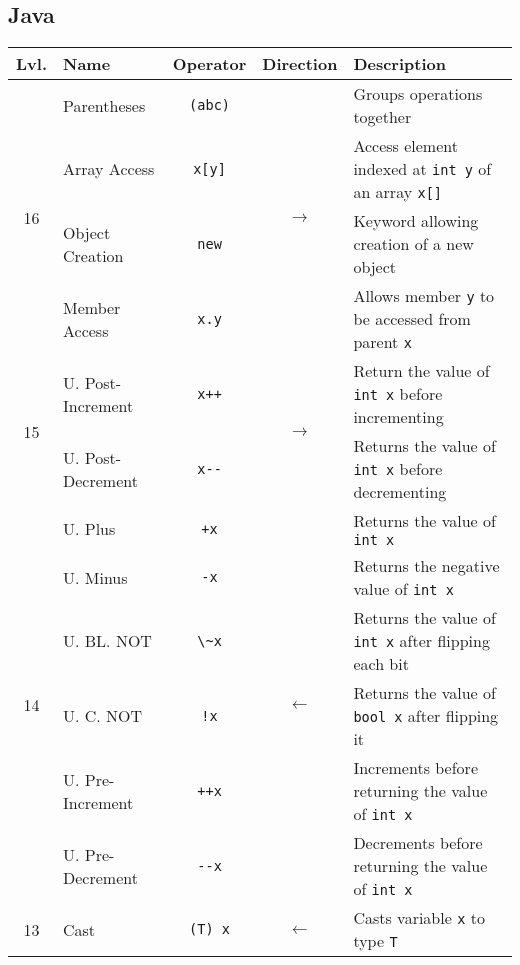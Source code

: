 \documentclass{article}
\begin{document}
\subsection{Java}
\begin{center}\begin{tabularx}{\textwidth}{clccX}\toprule
  Lvl.                & \quad Name        & Operator          & Direction & \qquad Description \\\midrule
  \multirow{4}{*}{16} & Parentheses       & \lstinline|(abc)| & \multirow{4}{*}{\(\to\)}& Groups operations together\\
                      & Array Access      & \lstinline|x[y]|  & & Access element indexed at \lstinline|int y| of an array \lstinline|x[]|\\
                      & Object Creation   & \lstinline|new|   & & Keyword allowing creation of a new object\\
                      & Member Access     & \lstinline|x.y|   & & Allows member \lstinline|y| to be accessed from parent \lstinline|x| \\ \midrule
  \multirow{2}{*}{15} & U. Post-Increment & \lstinline|x++|   & \multirow{2}{*}{\(\to\)} & Return the value of \lstinline|int x| before incrementing \\
                      & U. Post-Decrement & \lstinline|x--|   & & Returns the value of \lstinline|int x| before decrementing\\\midrule
  \multirow{6}{*}{14} & U. Plus           & \lstinline|+x|    & \multirow{6}{*}{\(\gets\)} & Returns the value of \lstinline|int x|\\
                      & U. Minus          & \lstinline|-x|    & & Returns the negative value of \lstinline|int x| \\
                      & U. BL. NOT        & \lstinline|\~x|  & & Returns the value of \lstinline|int x| after flipping each bit\\
                      & U. C. NOT         & \lstinline|!x|    & & Returns the value of \lstinline|bool x| after flipping it \\
                      & U. Pre-Increment  & \lstinline|++x|   & & Increments before returning the value of \lstinline|int x| \\
                      & U. Pre-Decrement  & \lstinline|--x|   & & Decrements before returning the value of \lstinline|int x| \\\midrule
                  13  & Cast              & \lstinline|(T) x| & \(\gets\) & Casts variable \lstinline|x| to type \lstinline|T| \\\midrule

\end{tabularx}
\end{center}
\end{document}
